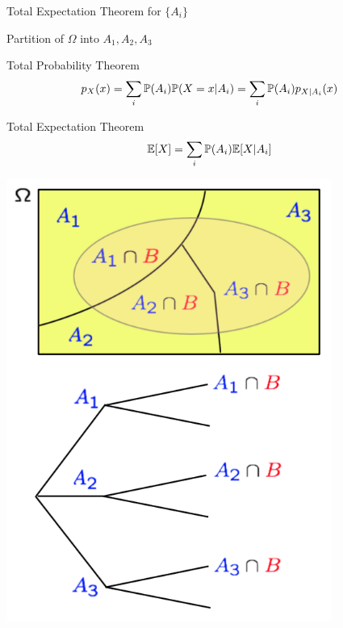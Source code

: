 \documentclass[fleqn,aspectratio=169]{beamer}
\begin{document}
\begin{frame}{Total Expectation Theorem for $\{A_i \}$}

{
\plitemsep 0.1in
\bci [$\circ$]

\item Partition of $\Omega$ into $A_1,A_2,A_3$


\bigskip
\medskip

\begin{block}{Total Probability Theorem}
$$
p_X(x) = \sum_{i} \mathbb{P}( A_i ) \mathbb{P}( X=x | A_i ) = \sum_{i} \mathbb{P}( A_i ) p_{X|A_i}(x) 
$$
\end{block}

\begin{block}{Total Expectation Theorem}
$$
\mathbb{E}[ X ] = \sum_{i} \mathbb{P}( A_i ) \mathbb{E}[ X | A_i ]
$$
\end{block}


\eci 
}
{
\centering
\includegraphics[width=0.8\textwidth]{L2_total_ex.png}
}

\end{frame}
\end{document}
